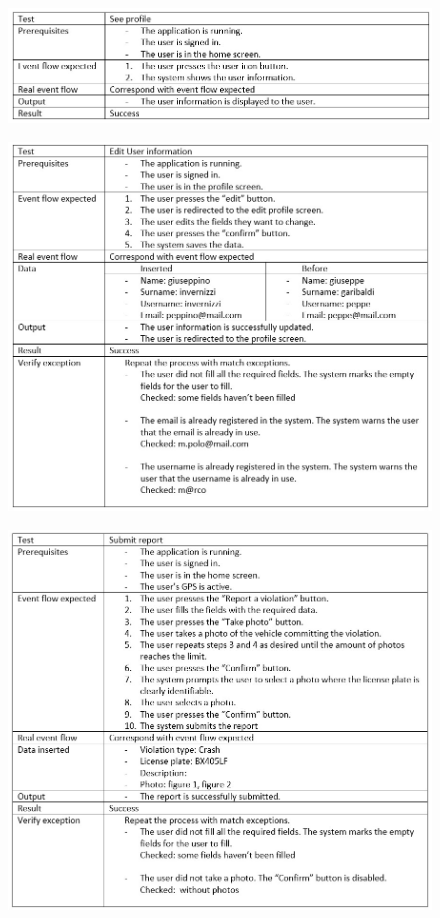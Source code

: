 \begin{figure}[H]
\centering
\includegraphics[width=\textwidth]{Images/seeprofile.png}
\end{figure}
\newpage
\begin{figure}[H]
\centering
\includegraphics[width=\textwidth]{Images/edituserinformation.png}
\end{figure}
\newpage
\begin{figure}[H]
\centering
\includegraphics[width=\textwidth]{Images/submitreport.png}
\end{figure}
